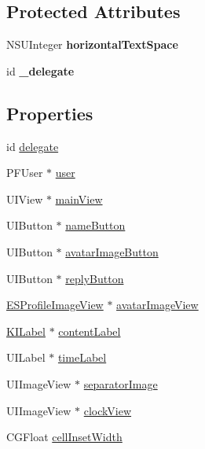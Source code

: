 \subsection*{Protected Attributes}
\begin{DoxyCompactItemize}
\item 
\hypertarget{interface_e_s_base_text_cell_a36ca33dc1f9b13941db8fca2efb88f10}{}N\+S\+U\+Integer {\bfseries horizontal\+Text\+Space}\label{interface_e_s_base_text_cell_a36ca33dc1f9b13941db8fca2efb88f10}

\item 
\hypertarget{interface_e_s_base_text_cell_a4c949285b01848c787d10e52151345b1}{}id {\bfseries \+\_\+delegate}\label{interface_e_s_base_text_cell_a4c949285b01848c787d10e52151345b1}

\end{DoxyCompactItemize}
\subsection*{Properties}
\begin{DoxyCompactItemize}
\item 
id \hyperlink{interface_e_s_base_text_cell_a199ecd22aed8dbb7c3e1425e3ebf0df8}{delegate}
\item 
P\+F\+User $\ast$ \hyperlink{interface_e_s_base_text_cell_abde10378758e52da264c20fa64f09b6c}{user}
\item 
U\+I\+View $\ast$ \hyperlink{interface_e_s_base_text_cell_ac553762888205865a2b83ddf9e285d2b}{main\+View}
\item 
U\+I\+Button $\ast$ \hyperlink{interface_e_s_base_text_cell_ac348ef1f190886455518d36cc3828e13}{name\+Button}
\item 
U\+I\+Button $\ast$ \hyperlink{interface_e_s_base_text_cell_ab78f6077f6a4adbc4279d1481801aa2f}{avatar\+Image\+Button}
\item 
U\+I\+Button $\ast$ \hyperlink{interface_e_s_base_text_cell_a9ce7dfc74d6bba195bd1036f98e5375b}{reply\+Button}
\item 
\hyperlink{interface_e_s_profile_image_view}{E\+S\+Profile\+Image\+View} $\ast$ \hyperlink{interface_e_s_base_text_cell_a3afbb92a442232007932c5fb6403fc70}{avatar\+Image\+View}
\item 
\hyperlink{interface_k_i_label}{K\+I\+Label} $\ast$ \hyperlink{interface_e_s_base_text_cell_a6927a252eca5009fee050dac34234e38}{content\+Label}
\item 
U\+I\+Label $\ast$ \hyperlink{interface_e_s_base_text_cell_ae5d9c5a4863daeeb7ff40486a5429f38}{time\+Label}
\item 
U\+I\+Image\+View $\ast$ \hyperlink{interface_e_s_base_text_cell_a96269b10810df372b3661d2c58e471d6}{separator\+Image}
\item 
U\+I\+Image\+View $\ast$ \hyperlink{interface_e_s_base_text_cell_a40f80dae70a3041498e02108f0af9c67}{clock\+View}
\item 
C\+G\+Float \hyperlink{interface_e_s_base_text_cell_a33fe87f42012cfb4ca4e494e4b6644ac}{cell\+Inset\+Width}
\end{DoxyCompactItemize}


